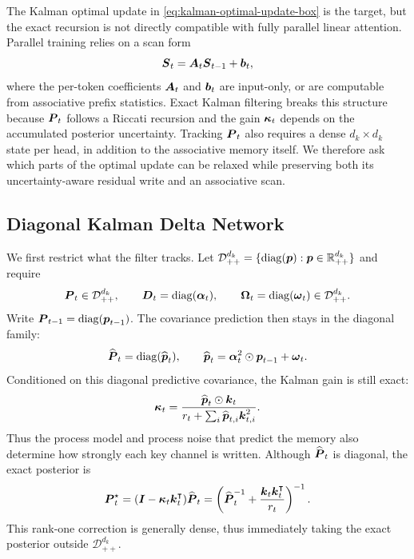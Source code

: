\documentclass[11pt,letterpaper,logo]{yalearxiv}
\begin{document}
The Kalman optimal update in \eqref{eq:kalman-optimal-update-box} is the target, but the
exact recursion is not directly compatible with fully parallel linear attention. Parallel
training relies on a scan form
\begin{equation}
  \boldsymbol{S}_t=\boldsymbol{A}_t\boldsymbol{S}_{t-1}+\boldsymbol{b}_t,
  \label{eq:parallel-affine-scan}
\end{equation}
where the per-token coefficients $\boldsymbol{A}_t$ and $\boldsymbol{b}_t$ are input-only, or are computable from
associative prefix statistics. Exact Kalman filtering breaks this structure because
$\boldsymbol{P}_t$ follows a Riccati recursion and the gain $\boldsymbol{\kappa}_t$ depends on the accumulated
posterior uncertainty. Tracking $\boldsymbol{P}_t$ also requires a dense $d_k\times d_k$ state per head,
in addition to the associative memory itself. We therefore ask which parts of the optimal update
can be relaxed while preserving both its uncertainty-aware residual write and an associative
scan.

\subsection{Diagonal Kalman Delta Network}
\label{sec:diagonal-kdn}

We first restrict what the filter tracks. Let
$\mathcal{D}_{++}^{d_k}=\{\operatorname{diag}(\boldsymbol{p}):\boldsymbol{p}\in\mathbb{R}_{++}^{d_k}\}$ and require
\begin{equation}
  \boldsymbol{P}_t\in\mathcal{D}_{++}^{d_k},
  \qquad
  \boldsymbol{D}_t=\operatorname{diag}(\boldsymbol{\alpha}_t),
  \qquad
  \boldsymbol{\Omega}_t=\operatorname{diag}(\boldsymbol{\omega}_t)\in\mathcal{D}_{++}^{d_k}.
  \label{eq:diag-cov-info}
\end{equation}
Write $\boldsymbol{P}_{t-1}=\operatorname{diag}(\boldsymbol{p}_{t-1})$. The covariance prediction then stays in the diagonal
family:
\begin{equation}
  \widehat{\boldsymbol{P}}_t=\operatorname{diag}(\widehat{\boldsymbol{p}}_t),
  \qquad
  \widehat{\boldsymbol{p}}_t
  =\boldsymbol{\alpha}_t^2\odot\boldsymbol{p}_{t-1}+\boldsymbol{\omega}_t.
  \label{eq:diag-covariance-prediction}
\end{equation}
Conditioned on this diagonal predictive covariance, the Kalman gain is still exact:
\begin{equation}
  \boldsymbol{\kappa}_t =
  \frac{\widehat{\boldsymbol{p}}_t\odot \boldsymbol{k}_t}
  {r_t+\sum_i \widehat{\boldsymbol{p}}_{t,i}\boldsymbol{k}_{t,i}^2}.
  \label{eq:diag-kalman-gain}
\end{equation}
Thus the process model and process noise that predict the memory also determine how strongly each
key channel is written. Although $\widehat{\boldsymbol{P}}_t$ is diagonal, the exact posterior is
\begin{equation}
  \boldsymbol{P}_t^\star
  =(\boldsymbol{I}-\boldsymbol{\kappa}_t\boldsymbol{k}_t^{\intercal})\widehat{\boldsymbol{P}}_t
  =\left(\widehat{\boldsymbol{P}}_t^{-1}
  +\frac{\boldsymbol{k}_t\boldsymbol{k}_t^{\intercal}}{r_t}\right)^{-1}.
  \label{eq:diag-exact-info-update}
\end{equation}
This rank-one correction is generally dense, thus immediately taking the exact posterior outside
$\mathcal{D}_{++}^{d_k}$.
\end{document}
